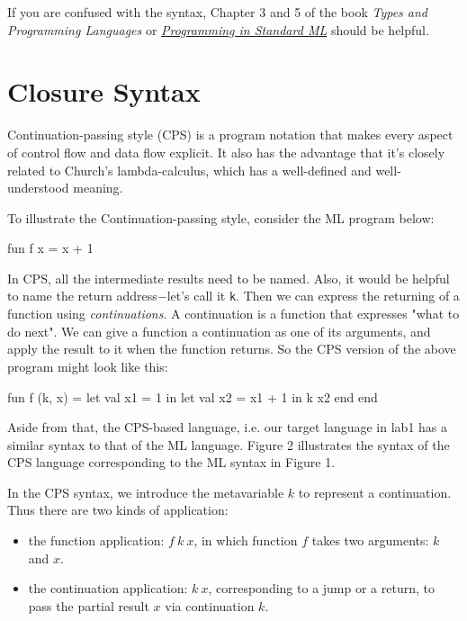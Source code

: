 \documentclass{article}
\theoremstyle{definition}
\theoremstyle{remark}
\numberwithin{equation}{section}
\begin{document}
If you are confused with the syntax, Chapter 3 and 5 of the book
\textit{Types and Programming Languages} or \href{
http://www.cs.cmu.edu/~rwh/smlbook/}{\textit{Programming in Standard ML}}
 should be helpful.\\


\section{Closure Syntax}

Continuation-passing style (CPS) is a program notation that makes every
aspect of control flow and data flow explicit. It also has the advantage
 that it's closely related to Church's lambda-calculus, which has a well-defined
  and well-understood meaning.

To illustrate the Continuation-passing style, consider the ML program below:
\begin{code}
fun f x =
    x + 1
\end{code}


In CPS, all the intermediate results need to be named. Also, it would be
helpful to name the return address$-$let's call it \texttt{k}. Then we can
 express the
returning of a function using \emph{continuations}. A continuation is a
function that expresses "what to do next". We can give a function a
continuation as one of its arguments, and apply the result to it when the
function returns. So the CPS version of the above program might look like this:

\begin{code}
fun f (k, x) =
    let val x1 = 1
    in  let val x2 = x1 + 1
        in k x2
        end
    end
\end{code}

Aside from that, the CPS-based language, i.e. our target language
in lab1 has a similar syntax to that of the ML language. Figure 2
 illustrates the syntax of the CPS language corresponding
to the ML syntax in Figure 1.


In the CPS syntax, we introduce the metavariable $k$ to represent
a continuation. Thus there are two kinds of application:
\begin{itemize}
  \item the function application: $f\ k\ x$, in which function
$f$ takes two arguments: $k$ and $x$.
  \item the continuation application: $k\ x$, corresponding to a jump
   or a return, to pass the partial result $x$ via continuation $k$.
\end{itemize}
\end{document}
